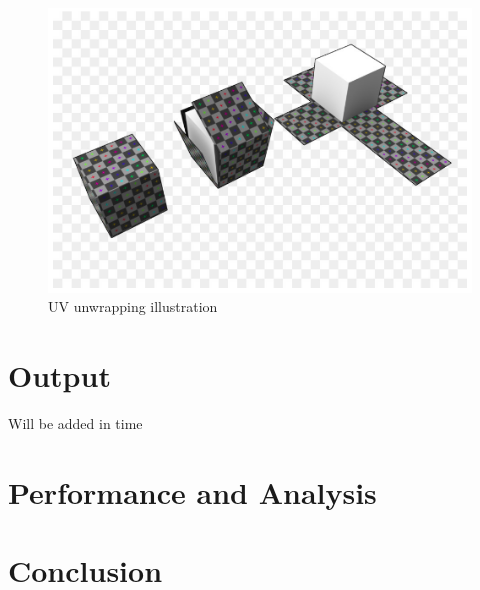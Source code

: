 \documentclass{article}
\begin{document}
\begin{figure}[H]
    \centering
    \includegraphics[width=15cm]{images/UVUnwrapping.png}
    \caption{UV unwrapping illustration}
    \label{fig:my_label}
\end{figure}


    
\newpage    
\section{Output}
Will be added in time

\section{Performance and Analysis}

\blindtext
\section{Conclusion}
\end{document}

